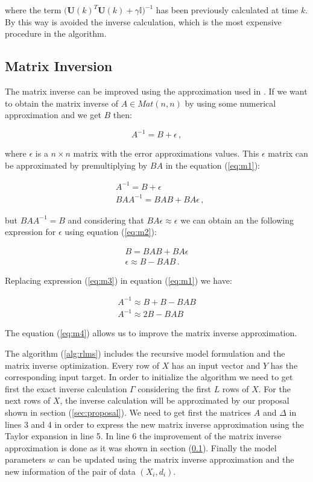where the term $\big(\mathbf{U}(k)^T\mathbf{U}(k) + 
\gamma \mathbb{I} \big) ^{-1}$ has been previously calculated at time $k$.
By this way is avoided the inverse calculation, which is the most expensive
procedure in the algorithm. 


\subsection{Matrix Inversion} \label{sec:matrixinv}

The matrix inverse can be improved using the approximation used in \cite{obrien1982}. If we want to obtain the matrix inverse of $A \in Mat(n,n)$ by using some numerical approximation and we get $B$ then:

\begin{equation} \label{eq:m1}
A^{-1} = B + \epsilon \, ,
\end{equation}

where $\epsilon$ is a $n \times n$ matrix with the error approximations values. This $\epsilon$ matrix can be approximated by premultiplying by $BA$ in the equation (\ref{eq:m1}):

\begin{align} \label{eq:m2}
& A^{-1} = B + \epsilon  \nonumber \\
& BAA^{-1} =  BAB + BA\epsilon \, ,
\end{align}

but $BAA^{-1}=B$ and considering that $BA\epsilon \approx \epsilon$ we can obtain an the following expression for $\epsilon$ using equation (\ref{eq:m2}):

\begin{align} \label{eq:m3}
B =  BAB + BA\epsilon \nonumber \\
\epsilon \approx B-BAB \, .
\end{align}

Replacing expression (\ref{eq:m3}) in equation (\ref{eq:m1}) we have:

\begin{align} \label{eq:m4}
A^{-1} \approx B + B-BAB \nonumber \\
A^{-1} \approx 2B - BAB
\end{align}

The equation (\ref{eq:m4}) allows us to improve the matrix inverse approximation.


The algorithm (\ref{alg:rlms}) includes the recursive model formulation and the matrix inverse optimization. Every row of $X$ has an input vector and $Y$ has the corresponding input target. 
In order to initialize the algorithm we need to get first the exact inverse calculation $\Gamma$ considering the first $L$ rows of $X$. For the next rows of $X$, the inverse calculation will be approximated by our proposal shown in section (\ref{sec:proposal}). We need to get first the matrices $A$ and $\Delta$ in lines 3 and 4 in order to express the new matrix inverse approximation using the Taylor expansion in line 5. In line 6 the improvement of the matrix inverse approximation is done as it was shown in section (\ref{sec:matrixinv}). Finally the model parameters $w$ can be updated using the matrix inverse approximation and the new information of the pair of data $(X_{i},d_{i})$.

